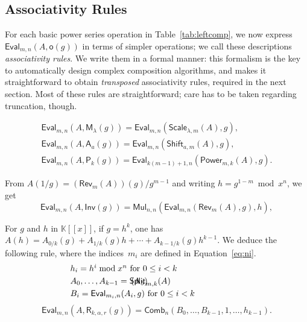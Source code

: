 \documentclass{sig-alternate}
\def\K {\ensuremath{\mathbb{K}}}
\def\M{\ensuremath{\mathsf{M}}}
\def\o {\ensuremath{\mathsf{o}}}
\def\shift {\ensuremath{\mathsf{A}}}
\def\Shift {\ensuremath{\mathsf{Shift}}}
\def\Scale {\ensuremath{\mathsf{Scale}}}
\def\power {\ensuremath{\mathsf{P}}}
\def\Power {\ensuremath{\mathsf{Power}}}
\def\root {\ensuremath{\mathsf{R}}}
\def\Root {\ensuremath{\mathsf{Split}}}
\def\LinComb {\ensuremath{\mathsf{Comb}}}
\def\Rev {\ensuremath{\mathsf{Rev}}}
\def\inv {\ensuremath{\mathsf{Inv}}}
\def\mul {\ensuremath{\mathsf{Mul}}}
\def\Eval {\ensuremath{\mathsf{Eval}}}
\begin{document}
\subsection{Associativity Rules}\label{ssec:ar}

For each basic power series operation in Table~\ref{tab:leftcomp}, we
now express $\Eval_{m,n}(A,\o(g))$ in terms of simpler operations; we
call these descriptions \emph{associativity rules}. We write them in a
formal manner: this formalism is the key to automatically design
complex composition algorithms, and makes it straightforward to obtain
\emph{transposed} associativity rules, required in the next section.
Most of these rules are straightforward; care has to be taken
regarding truncation, though.

\smallskip{}
\begin{gather}
\label{AR:1}\tag{A$_1$}\Eval_{m,n}(A,\M_\lambda(g)) =
\Eval_{m,n}(\Scale_{\lambda,m}(A),g),\\
\label{AR:3}\tag{A$_2$}\Eval_{m,n}(A,\shift_a(g)) = \Eval_{m,n}(\Shift_{a,m}(A),g),\\
\label{AR:4}\tag{A$_3$}
\Eval_{m,n}(A,\power_k(g)) = \Eval_{k(m-1)+1,n}(\Power_{m,k}(A),g).
\end{gather}



  From $A(1/g) =
(\Rev_m(A))(g)/g^{m-1}$ and writing $h = g^{1-m} \bmod x^n$, we get
\begin{equation*}\label{AR:2}\tag{A$_4$}
\Eval_{m,n}(A,\inv(g))=\mul_{n,n}(\Eval_{m,n}(\Rev_m(A),g), h),
\end{equation*}


\smallskip{} For $g$ and $h$ in $\K[[x]]$,
if $g=h^k$, one has $A(h) = A_{0/k}(g) + A_{1/k}(g)h + \cdots
+A_{k-1/k}(g)h^{k-1}$. We deduce the following rule, where the
indices~$m_i$ are defined in Equation~\eqref{eq:ni}.
\begin{equation*}\label{AR:5}\tag{A$_5$}
\hspace{-3.4cm}\begin{array}{l}
h_i = h^i \bmod x^n \text{~for~} 0 \le i < k\\[1mm]
A_0,\dots,A_{k-1} = \Root_{m,k}(A)\notag\\[1mm]
B_i = \Eval_{m_i,n}(A_{i},g) \text{~for~} 0 \le i < k
\end{array}
\end{equation*}
\vskip-4mm
\begin{equation*}
\Eval_{m,n}(A,\root_{k,\alpha,r}(g)) = 
\LinComb_{n}(B_0,\dots,B_{k-1},1,\dots,h_{k-1}).
\end{equation*}
\end{document}

